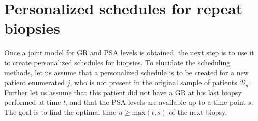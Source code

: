 
\section{Personalized schedules for repeat biopsies}
\label{sec : pers_sched_approaches}
Once a joint model for GR and PSA levels is obtained, the next step is to use it to create personalized schedules for biopsies. To elucidate the scheduling methods, let us assume that a personalized schedule is to be created for a new patient enumerated $j$, who is not present in the original sample of patients $\mathcal{D}_n$. Further let us assume that this patient did not have a GR at his last biopsy performed at time $t$, and that the PSA levels are available up to a time point $s$. The goal is to find the optimal time $u \geq \text{max}(t,s)$ of the next biopsy.



